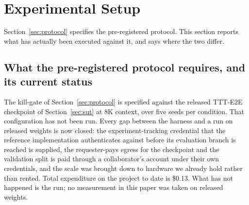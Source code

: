 %
%

\section{Experimental Setup}
\label{sec:setup}

Section~\ref{sec:protocol} specifies the pre-registered protocol. This section
reports what has actually been executed against it, and says where the two
differ.

\subsection{What the pre-registered protocol requires, and its current status}

The kill-gate of Section~\ref{sec:protocol} is specified against the released
TTT-E2E checkpoint of Section~\ref{sec:sut} at 8K context, over five seeds per
condition. That configuration has not been run. Every gap between the harness and
a run on released weights is now closed: the experiment-tracking credential that
the reference implementation authenticates against before its evaluation branch
is reached is supplied, the requester-pays egress for the checkpoint and the
validation split is paid through a collaborator's account under their own
credentials, and the scale was brought down to hardware we already hold rather
than rented. Total expenditure on the project to date is \$0.13. What has not
happened is the run; no measurement in this paper was taken on released weights.

